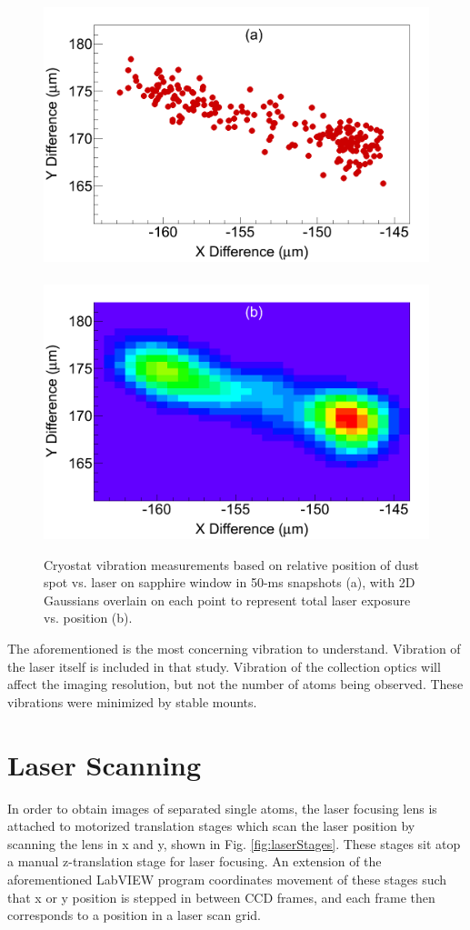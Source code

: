 
\begin{figure} %
        \centering
                \includegraphics[width=.5\textwidth]{figures/cryovibes_a.png}
                ~
                \includegraphics[width=.5\textwidth]{figures/cryovibes_b.png}
                \caption{Cryostat vibration measurements based on relative position of dust spot vs. laser on sapphire window in 50-ms snapshots (a), with 2D Gaussians overlain on each point to represent total laser exposure vs. position (b).}
\label{fig:cryovibe2D}
\end{figure}

The aforementioned is the most concerning vibration to understand.  Vibration of the laser itself is included in that study.  Vibration of the collection optics will affect the imaging resolution, but not the number of atoms being observed.  These vibrations were minimized by stable mounts.

\section{Laser Scanning}
\label{sec:laserscanning}

In order to obtain images of separated single atoms, the laser focusing lens is attached to motorized translation stages which scan the laser position by scanning the lens in x and y, shown in Fig. \ref{fig:laserStages}.  These stages sit atop a manual z-translation stage for laser focusing.  An extension of the aforementioned LabVIEW program coordinates movement of these stages such that x or y position is stepped in between CCD frames, and each frame then corresponds to a position in a laser scan grid.


